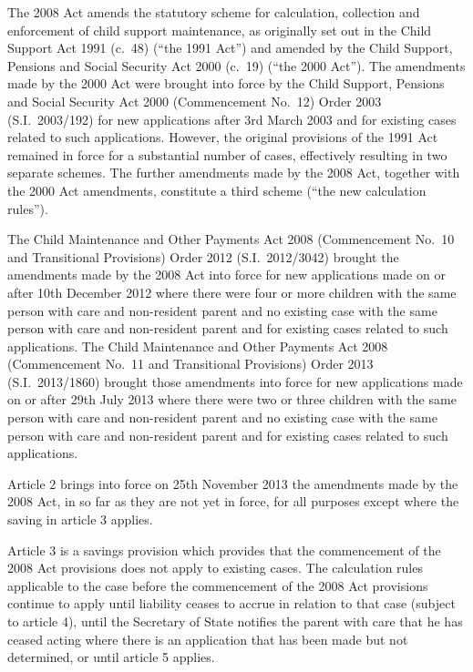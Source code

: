 \documentclass[12pt,a4paper]{article}
\begin{document}
The 2008 Act amends the statutory scheme for calculation, collection and enforcement of child support maintenance, as originally set out in the Child Support Act 1991 (c.~48) (“the 1991 Act”) and amended by the Child Support, Pensions and Social Security Act 2000 (c.~19) (“the 2000 Act”). The amendments made by the 2000 Act were brought into force by the Child Support, Pensions and Social Security Act 2000 (Commencement No.~12) Order 2003 (S.I.~2003/192) for new applications after 3rd March 2003 and for existing cases related to such applications. However, the original provisions of the 1991 Act remained in force for a substantial number of cases, effectively resulting in two separate schemes. The further amendments made by the 2008 Act, together with the 2000 Act amendments, constitute a third scheme (“the new calculation rules”).

The Child Maintenance and Other Payments Act 2008 (Commencement No.~10 and Transitional Provisions) Order 2012 (S.I.~2012/3042) brought the amendments made by the 2008 Act into force for new applications made on or after 10th December 2012 where there were four or more children with the same person with care and non-resident parent and no existing case with the same person with care and non-resident parent and for existing cases related to such applications. The Child Maintenance and Other Payments Act 2008 (Commencement No.~11 and Transitional Provisions) Order 2013 (S.I.~2013/1860) brought those amendments into force for new applications made on or after 29th July 2013 where there were two or three children with the same person with care and non-resident parent and no existing case with the same person with care and non-resident parent and for existing cases related to such applications.

Article 2 brings into force on 25th November 2013 the amendments made by the 2008 Act, in so far as they are not yet in force, for all purposes except where the saving in article 3 applies.

Article 3 is a savings provision which provides that the commencement of the 2008 Act provisions does not apply to existing cases. The calculation rules applicable to the case before the commencement of the 2008 Act provisions continue to apply until liability ceases to accrue in relation to that case (subject to article 4), until the Secretary of State notifies the parent with care that he has ceased acting where there is an application that has been made but not determined, or until article 5 applies.
\end{document}
